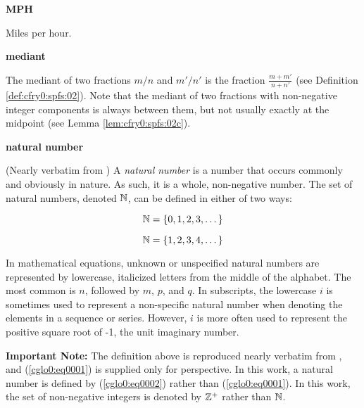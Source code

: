 \begin{vworktermglossaryenum}
\item \textbf{MPH}

      Miles per hour.

\item \textbf{mediant}

      The mediant of two fractions $m/n$ and $m'/n'$ is the fraction 
	  $\frac{m+m'}{n+n'}$ (see Definition 
	  \cfryzeroxrefhyphen{}\ref{def:cfry0:spfs:02}).  Note that the
	  mediant of two fractions with non-negative integer components
	  is always between them, but not usually exactly at the 
	  midpoint (see Lemma \cfryzeroxrefhyphen{}\ref{lem:cfry0:spfs:02c}).

\item \textbf{natural number}%
         
      (Nearly verbatim from \cite{bibref:w:wwwwhatiscom})
      A \emph{natural number}
      is a number that occurs commonly and obviously in nature.  
      As such, it is a whole, non-negative number.  
      The set of natural numbers, denoted ${\mathbb{N}}{}$, 
      can be defined in either of two ways:

      \begin{equation}
      \label{cglo0:eq0001}
      {\mathbb{N}}{} = \{ 0, 1, 2, 3, \ldots{} \}
      \end{equation}

      \begin{equation}
      \label{cglo0:eq0002}
      {\mathbb{N}}{} = \{ 1, 2, 3, 4, \ldots{} \}
      \end{equation}
      
      In mathematical equations, unknown or unspecified natural numbers 
      are represented by lowercase, italicized letters from the 
      middle of the alphabet.  The most common is $n$, followed by 
      $m$, $p$, and $q$.  
      In subscripts, the lowercase $i$ is sometimes used to represent 
      a non-specific natural number when denoting the elements in a 
      sequence or series.  However, $i$ is more often used to represent 
      the positive square root of -1, the unit imaginary number.

      \textbf{Important Note:}  The definition above is reproduced nearly
      verbatim from \cite{bibref:w:wwwwhatiscom}, and (\ref{cglo0:eq0001})
      is supplied only for perspective.  In this work, a natural
      number is defined by (\ref{cglo0:eq0002}) rather than (\ref{cglo0:eq0001}).
      In this work, the set of non-negative integers is denoted by
      ${\mathbb{Z}^+}{}$ rather than ${\mathbb{N}}{}$.%


\end{vworktermglossaryenum}
